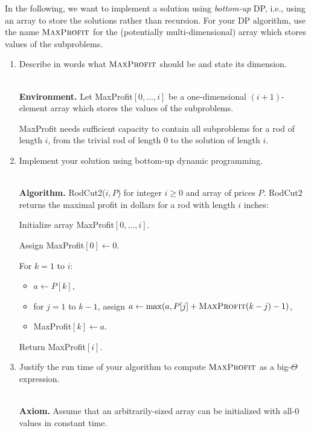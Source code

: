 In the following, we want to implement a solution using \emph{bottom-up} DP, i.e., using an array to store the solutions rather than recursion.
For your DP algorithm, use the name $\textsc{MaxProfit}$ for the (potentially multi-dimensional) array which stores values of the subproblems.
\begin{enumerate}[resume]   
    \item Describe in words what $\textsc{MaxProfit}$ should be and state its dimension.
\begin{solution}\\

\textbf{Environment. }Let {\sc MaxProfit}$[0,\dots,i]$ be a one-dimensional $(i+1)$-element array which stores the values of the subproblems.

{\sc MaxProfit} needs sufficient capacity to contain all subproblems for a rod of length $i$, from the trivial rod of length $0$ to the solution of length $i$.
\end{solution}
\newpage
    \item Implement your solution using bottom-up dynamic programming. 
\begin{solution}\\

\textbf{Algorithm. }{\sc RodCut2}($i,P$) for integer $i\geq 0$ and array of prices $P$. {\sc RodCut2} returns the maximal profit in dollars for a rod with length $i$ inches:

Initialize array {\sc MaxProfit}$[0,\dots,i]$.

Assign {\sc MaxProfit}$[0]\leftarrow 0$.

For $k=1$ to $i$:
\begin{itemize}
\item $a\leftarrow P[k]$,
\item for $j=1$ to $k-1$, assign $a\leftarrow\max(a,P[j]+\textsc{MaxProfit}(k-j)-1)$,
\item {\sc MaxProfit}$[k]\leftarrow a$.
\end{itemize}

Return {\sc MaxProfit}$[i]$.
\end{solution}
\item Justify the run time of your algorithm to compute $\textsc{MaxProfit}$ as a big-$\Theta$ expression.
\begin{solution}\\

\textbf{Axiom.} Assume that an arbitrarily-sized array can be initialized with all-$0$ values in constant time.


\end{solution}
\end{enumerate}
